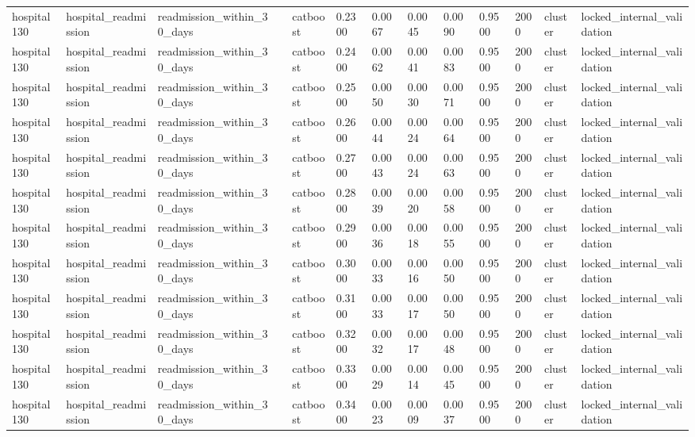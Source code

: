 \begin{tabular}{lllllllllllll}
hospital130 & hospital\_readmission & readmission\_within\_30\_days &  & catboost & 0.2300 & 0.0067 & 0.0045 & 0.0090 & 0.9500 & 2000 & cluster & locked\_internal\_validation \\
hospital130 & hospital\_readmission & readmission\_within\_30\_days &  & catboost & 0.2400 & 0.0062 & 0.0041 & 0.0083 & 0.9500 & 2000 & cluster & locked\_internal\_validation \\
hospital130 & hospital\_readmission & readmission\_within\_30\_days &  & catboost & 0.2500 & 0.0050 & 0.0030 & 0.0071 & 0.9500 & 2000 & cluster & locked\_internal\_validation \\
hospital130 & hospital\_readmission & readmission\_within\_30\_days &  & catboost & 0.2600 & 0.0044 & 0.0024 & 0.0064 & 0.9500 & 2000 & cluster & locked\_internal\_validation \\
hospital130 & hospital\_readmission & readmission\_within\_30\_days &  & catboost & 0.2700 & 0.0043 & 0.0024 & 0.0063 & 0.9500 & 2000 & cluster & locked\_internal\_validation \\
hospital130 & hospital\_readmission & readmission\_within\_30\_days &  & catboost & 0.2800 & 0.0039 & 0.0020 & 0.0058 & 0.9500 & 2000 & cluster & locked\_internal\_validation \\
hospital130 & hospital\_readmission & readmission\_within\_30\_days &  & catboost & 0.2900 & 0.0036 & 0.0018 & 0.0055 & 0.9500 & 2000 & cluster & locked\_internal\_validation \\
hospital130 & hospital\_readmission & readmission\_within\_30\_days &  & catboost & 0.3000 & 0.0033 & 0.0016 & 0.0050 & 0.9500 & 2000 & cluster & locked\_internal\_validation \\
hospital130 & hospital\_readmission & readmission\_within\_30\_days &  & catboost & 0.3100 & 0.0033 & 0.0017 & 0.0050 & 0.9500 & 2000 & cluster & locked\_internal\_validation \\
hospital130 & hospital\_readmission & readmission\_within\_30\_days &  & catboost & 0.3200 & 0.0032 & 0.0017 & 0.0048 & 0.9500 & 2000 & cluster & locked\_internal\_validation \\
hospital130 & hospital\_readmission & readmission\_within\_30\_days &  & catboost & 0.3300 & 0.0029 & 0.0014 & 0.0045 & 0.9500 & 2000 & cluster & locked\_internal\_validation \\
hospital130 & hospital\_readmission & readmission\_within\_30\_days &  & catboost & 0.3400 & 0.0023 & 0.0009 & 0.0037 & 0.9500 & 2000 & cluster & locked\_internal\_validation \\

\end{tabular}
